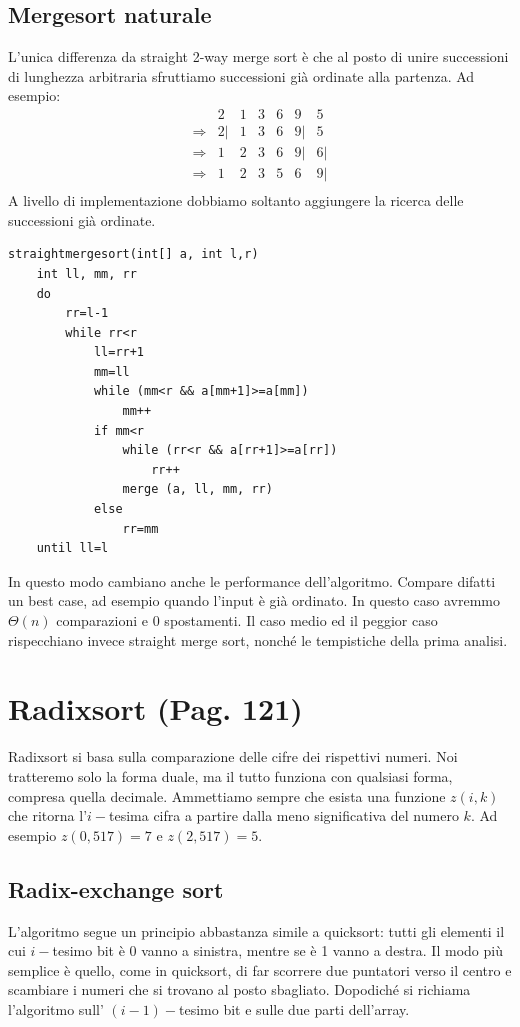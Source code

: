 \documentclass[a4paper]{book}
\newcommand{\lstIndent}{4}
\begin{document}
\subsection*{Mergesort naturale}
L'unica differenza da straight 2-way merge sort è che al posto di unire successioni di lunghezza arbitraria sfruttiamo successioni già ordinate alla partenza. Ad esempio:
\[\begin{array}{*{20}{c}}
{}&{2}&1&{3}&{6}&9&5\\
{\Rightarrow}&{2|}&{1}&{3}&{6}&{9|}&{5}\\
{\Rightarrow}&1&{2}&{3}&{6}&{9|}&{6|}\\
{\Rightarrow}&1&{2}&{3}&5&{6}&{9|}\\
\end{array}\]
A livello di implementazione dobbiamo soltanto aggiungere la ricerca delle successioni già ordinate.
\begin{lstlisting}[tabsize=\lstIndent]
straightmergesort(int[] a, int l,r)
	int ll, mm, rr
	do
		rr=l-1
		while rr<r
			ll=rr+1
			mm=ll	
			while (mm<r && a[mm+1]>=a[mm])
				mm++
			if mm<r
				while (rr<r && a[rr+1]>=a[rr])
					rr++
				merge (a, ll, mm, rr)
			else
				rr=mm
	until ll=l								
\end{lstlisting}
In questo modo cambiano anche le performance dell'algoritmo. Compare difatti un best case, ad esempio quando l'input è già ordinato. In questo caso avremmo $\Theta (n)$ comparazioni e 0 spostamenti. Il caso medio ed il peggior caso rispecchiano invece straight merge sort, nonché le tempistiche della prima analisi.
\section{Radixsort (Pag. 121)}
Radixsort si basa sulla comparazione delle cifre dei rispettivi numeri. Noi tratteremo solo la forma duale, ma il tutto funziona con qualsiasi forma, compresa quella decimale. Ammettiamo sempre che esista una funzione $z(i,k)$ che ritorna l'$i-$tesima cifra a partire dalla meno significativa del numero $k$. Ad esempio $z(0,517)=7$ e $z(2, 517)=5$.
\subsection{Radix-exchange sort}
L'algoritmo segue un principio abbastanza simile a quicksort: tutti gli elementi il cui $i-$tesimo bit è 0 vanno a sinistra, mentre se è 1 vanno a destra. Il modo più semplice è quello, come in quicksort, di far scorrere due puntatori verso il centro e scambiare i numeri che si trovano al posto sbagliato. Dopodiché si richiama l'algoritmo sull' $(i-1)-$tesimo bit e sulle due parti dell'array.
\end{document}
